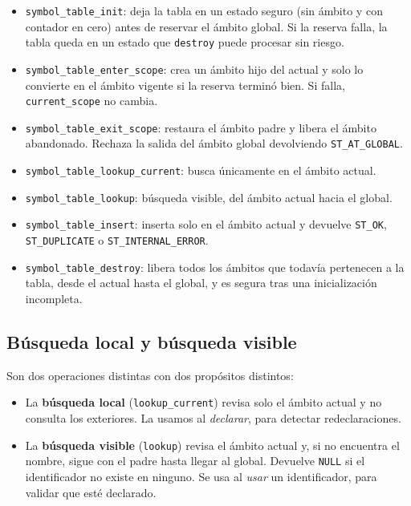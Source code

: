 \documentclass[12pt,letterpaper]{article}
\begin{document}
\begin{itemize}
\item \texttt{symbol\_table\_init}: deja la tabla en un estado seguro (sin ámbito y con contador en cero) antes
  de reservar el ámbito global. Si la reserva falla, la tabla queda en un estado que \texttt{destroy} puede
  procesar sin riesgo.
  
\item \texttt{symbol\_table\_enter\_scope}: crea un ámbito hijo del actual y solo lo convierte en el ámbito
  vigente si la reserva terminó bien. Si falla, \texttt{current\_scope} no cambia.
  
\item \texttt{symbol\_table\_exit\_scope}: restaura el ámbito padre y libera el ámbito abandonado. Rechaza la
  salida del ámbito global devolviendo \texttt{ST\_AT\_GLOBAL}.
  
\item \texttt{symbol\_table\_lookup\_current}: busca únicamente en el ámbito actual.
  
\item \texttt{symbol\_table\_lookup}: búsqueda visible, del ámbito actual hacia el global.
  
\item \texttt{symbol\_table\_insert}: inserta solo en el ámbito actual y devuelve \texttt{ST\_OK},
  \texttt{ST\_DUPLICATE} o \texttt{ST\_INTERNAL\_ERROR}.
  
\item \texttt{symbol\_table\_destroy}: libera todos los ámbitos que todavía pertenecen a la tabla, desde el
  actual hasta el global, y es segura tras una inicialización incompleta.
\end{itemize}

\subsection*{Búsqueda local y búsqueda visible}

Son dos operaciones distintas con dos propósitos distintos:

\begin{itemize}
\item La \textbf{búsqueda local} (\texttt{lookup\_current}) revisa solo el ámbito actual y no consulta los
  exteriores. La usamos al \emph{declarar}, para detectar redeclaraciones.
  
\item La \textbf{búsqueda visible} (\texttt{lookup}) revisa el ámbito actual y, si no encuentra el nombre,
  sigue con el padre hasta llegar al global. Devuelve \texttt{NULL} si el identificador no existe en ninguno.
  Se usa al \emph{usar} un identificador, para validar que esté declarado.
\end{itemize}
\end{document}
